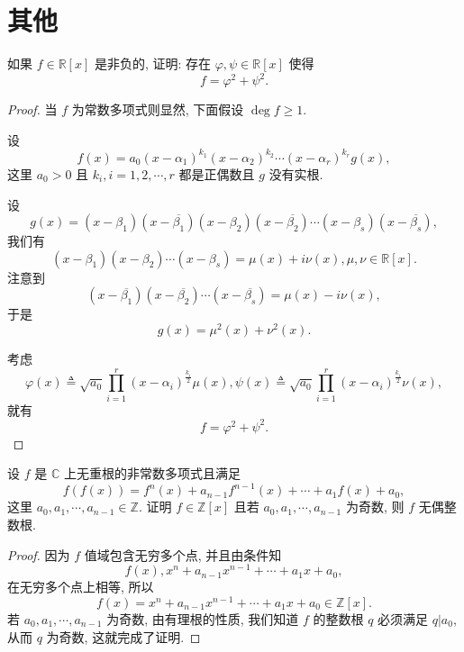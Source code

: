 \documentclass[../../main.tex]{subfiles}%
\begin{document}
\section{其他}

\begin{example}
如果 \( f \in \mathbb{R}[x] \) 是非负的, 证明: 存在 \( \varphi, \psi \in \mathbb{R}[x] \) 使得
\[
f = \varphi^2 + \psi^2.
\]
\end{example}
\begin{proof}
当 \( f \) 为常数多项式则显然, 下面假设 \( \deg f \geqslant 1 \).

设
\[
f(x) = a_0 (x - \alpha_1)^{k_1} (x - \alpha_2)^{k_2} \cdots (x - \alpha_r)^{k_r} g(x),
\]
这里 \( a_0 > 0 \) 且 \( k_i, i = 1,2,\cdots,r \) 都是正偶数且 \( g \) 没有实根.

设
\[
g(x) = (x - \beta_1)(x - \overline{\beta_1})(x - \beta_2)(x - \overline{\beta_2}) \cdots (x - \beta_s)(x - \overline{\beta_s}),
\]
我们有
\[
(x - \beta_1)(x - \beta_2) \cdots (x - \beta_s) = \mu(x) + i\nu(x), \mu, \nu \in \mathbb{R}[x].
\]
注意到
\[
(x - \overline{\beta_1})(x - \overline{\beta_2}) \cdots (x - \overline{\beta_s}) = \mu(x) - i\nu(x),
\]
于是
\[
g(x) = \mu^2(x) + \nu^2(x).
\]

考虑
\[
\varphi(x) \triangleq \sqrt{a_0} \prod_{i=1}^r (x - \alpha_i)^{\frac{k_i}{2}} \mu(x), \psi(x) \triangleq \sqrt{a_0} \prod_{i=1}^r (x - \alpha_i)^{\frac{k_i}{2}} \nu(x),
\]
就有
\[
f = \varphi^2 + \psi^2.
\]
\end{proof}

\begin{example}
设 \( f \) 是 \( \mathbb{C} \) 上无重根的非常数多项式且满足
\[
f(f(x)) = f^n(x) + a_{n-1}f^{n-1}(x) + \cdots + a_1f(x) + a_0,
\]
这里 \( a_0, a_1, \cdots, a_{n-1} \in \mathbb{Z} \). 证明 \( f \in \mathbb{Z}[x] \) 且若 \( a_0, a_1, \cdots, a_{n-1} \) 为奇数, 则 \( f \) 无偶整数根.
\end{example}
\begin{proof}
因为 \( f \) 值域包含无穷多个点, 并且由条件知
\[
f(x), x^n + a_{n-1}x^{n-1} + \cdots + a_1x + a_0,
\]
在无穷多个点上相等, 所以
\[
f(x) = x^n + a_{n-1}x^{n-1} + \cdots + a_1x + a_0 \in \mathbb{Z}[x].
\]
若 \( a_0, a_1, \cdots, a_{n-1} \) 为奇数, 由有理根的性质, 我们知道 \( f \) 的整数根 \( q \) 必须满足 \( q|a_0 \), 从而 \( q \) 为奇数, 这就完成了证明.
\end{proof}
\end{document}
